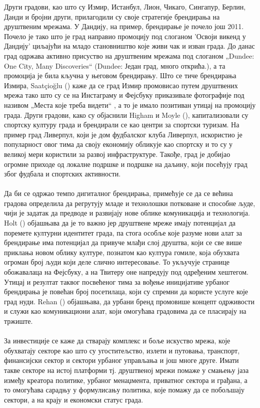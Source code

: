 \documentclass{article}
\begin{document}
Други градови, као што су Измир, Истанбул, Лион, Чикаго, Сингапур, Берлин, Данди и бројни други, прилагодили су своје стратегије брендирања на друштвеним мрежама. У Дандију, на пример, брендирање је почело још 2011. Почело је тако што је град направио промоцију под слоганом 'Освоји викенд у Дандију' циљајући на младо становништво које живи чак и изван града. До данас град одржава активно присуство на друштвеним мрежама под слоганом „Dundee: One City, Many Discoveries“ (Dundee: Један град, много открића.), а  та промоција је била кључна у његовом брендирању. Што се тиче брендирања Измира, Saatçioğlu (\cite{sa_2017}) каже да се град Измир промовисао путем друштвених мрежа тако што су се на Инстаграму и Фејсбуку приказивале фотографије под називом „Места које треба видети“ , а то је имало позитиван утицај на промоцију града. Други градови, како су објаснили Higham и Moyle (\cite{hm_2016}), капитализовали су спортску културу града и брендирали се као центри за спортски туризам. На пример град Ливерпул, који је дом фудбалског клуба Ливерпул, искористио је популарност овог тима да своју економију обликује као спортску и то су у великој мери користили за развој инфраструктуре. Такође, град је добијао огромне приходе од локалне подршке и подршке на даљину, који посећују град због фудбала и спортских активности.
\\\\
Да би се одржао темпо дигиталног брендирања, примећује се да се већина градова определила да регрутују младе и технолошки потковане и способне људе, чији је задатак да предводе и развијају нове облике комуникација и технологија. Holt (\cite{ho_2016}) објашњава да је то важно јер друштвене мреже имају потенцијал да поремете културни идентитет града, па стога особље које разуме нови алат за брендирање има потенцијал да привуче млађи слој друштва, који се све више приклања новом облику културе, познатом као култура гомиле, која обухвата огроман број људи који деле слично интересовање. То укључује странице обожавалаца на Фејсбуку, а на Твитеру оне напредују под одређеним хештегом. Утицај и резултат таквог посвећеног тима за вођење иницијативе урбаног брендирања је повећан број посетилаца, који су спремни да користе услуге које град нуди. Rehan (\cite{re_2014}) објашњава, да урбани бренд промовише концепт одрживости и служи као комуникациони алат, који омогућава градовима да се пласирају на тржиште. 
\\\\
За инвестиције се каже да стварају комплекс и боље искуство мрежа, које обухватају секторе као што су угоститељство, излети и путовања, транспорт, финансијски сектор и сектори урбаног управљања и још многе друге. Имати такве секторе на истој платформи тј. друштвеној мрежи помаже у смањењу јаза између креатора политике, урбаног менаџмента, приватног сектора и грађана, а то омогућава сарадњу у формулисању политика, које помажу да се побољшају сектори, а на крају и економски статус града.
\end{document}
